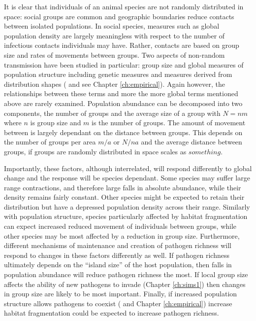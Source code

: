 It is clear that individuals of an animal species are not randomly distributed in space: social groups are common \cite{kerth2008causes} and geographic boundaries reduce contacts between isolated populations.
In social species, measures such as global population density are largely meaningless with respect to the number of infectious contacts individuals may have.
Rather, contacts are based on group size and rates of movements between groups.
Two aspects of non-random transmission have been studied in particular: group size \cite{vitone2004body, gay2014parasite, ezenwa2006host, rifkin2012animals, nunn2003comparative} and global measures of population structure including genetic measures and measures derived from distribution shapes (\textcite{gay2014parasite, maganga2014bat, turmelle2009correlates} and see Chapter \ref{ch:empirical}).
Again however, the relationships between these terms and more the more global terms mentioned above are rarely examined.
Population abundance can be decomposed into two components, the number of groups and the average size of a group with $N = nm$ where $n$ is group size and $m$ is the number of groups.
The amount of movement between is largely dependant on the distance between groups.
This depends on the number of groups per area $m/a$ or $N/na$ and the average distance between groups, if groups are randomly distributed in space scales as $something$.



Importantly, these factors, although interrelated, will respond differently to global change and the response will be species dependant.
Some species may suffer large range contractions, and therefore large falls in absolute abundance, while their density remains fairly constant.
Other species might be expected to retain their distribution but have a depressed population density across their range.
Similarly with population structure, species particularly affected by habitat fragmentation can expect increased reduced movement of individuals between groups, while other species may be most affected by a reduction in group size.
Furthermore, different mechanisms of maintenance and creation of pathogen richness will respond to changes in these factors differently as well.
If pathogen richness ultimately depends on the ``island size'' of the host population, then falls in population abundance will reduce pathogen richness the most.
If local group size affects the ability of new pathogens to invade (Chapter \ref{ch:sims1}) then changes in group size are likely to be most important.
Finally, if increased population structure allows pathogens to coexist (\parencite{qiu2013vector, allen2004sis, nunes2006localized} and Chapter \ref{ch:empirical}) increase habitat fragmentation could be expected to increase pathogen richness.

